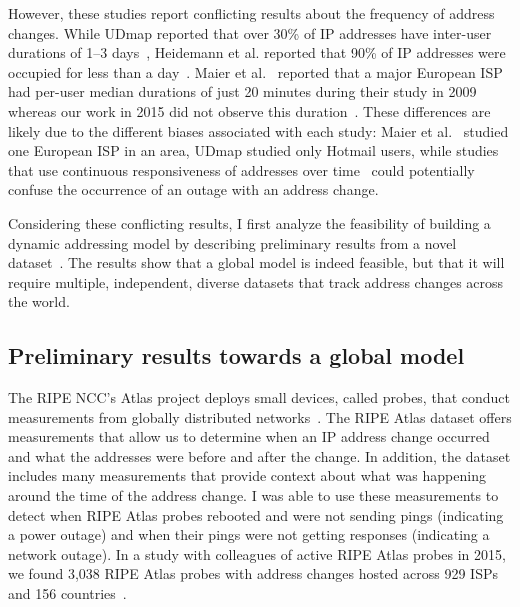 However, these studies report conflicting results about the frequency
of address changes. While UDmap reported that over 30\% of IP addresses have
inter-user durations of 1--3 days~\cite{udmap},  Heidemann et
al. reported that 90\% of IP addresses were occupied for less than a
day~\cite{census-survey}.  Maier et al.~\cite{maier2009dominant} reported that a
major European ISP had per-user median durations of just 20 minutes during
their study in 2009 whereas our work in 2015 did not observe this
duration~\cite{addrchange-reasons}. These differences are likely due
to the different biases associated with each study: Maier et
al.~\cite{maier2009dominant} studied one European ISP in an area,
UDmap studied only Hotmail users, while studies that use continuous
responsiveness of addresses over time~\cite{zmap-dhcp, census-survey} could
potentially confuse the occurrence of an outage with an address change.

Considering these conflicting results,
I first analyze the feasibility of building a dynamic addressing
model by describing preliminary results from a novel dataset~\cite{addrchange-reasons}. The
results show that a global model is indeed feasible, but that it will
require multiple, independent, diverse datasets that track address changes across
the world. %


\subsection{Preliminary results towards a global model}

The RIPE NCC's Atlas project deploys small devices, called probes, that
conduct measurements from globally distributed
networks~\cite{atlas}. The RIPE Atlas dataset offers measurements that allow us to
determine when an IP address change occurred and what the addresses
were before and after the change. In addition, the dataset includes many
measurements that provide context about what was happening around the
time of the address change. I was able to use these measurements to
detect when RIPE Atlas probes rebooted and were not sending pings
(indicating a power outage) and when their pings were not getting
responses (indicating a network outage). In a study with colleagues of active RIPE
Atlas probes in 2015, we found 3,038 RIPE Atlas probes with address
changes hosted across 929 ISPs and 156 countries~\cite{addrchange-reasons}.

